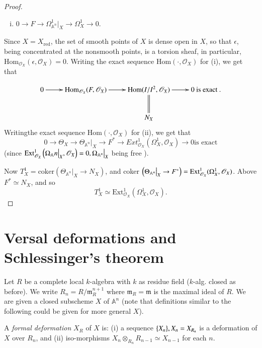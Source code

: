 {\begin{proof}
\begin{enumerate}[(i)]
\item $0 \to F \to \Omega^{1}_{\mathbb{A}^{n}}\big |_X \to \Omega_X^{1}\to 0$.
\end{enumerate}

Since $X=X_{\text{red}}$, the set of smooth points of $X$ is dense
open in $X$, so that $\epsilon$, being concentrated at the nonsmooth
points, is a torsion sheaf, in particular,
$\text{Hom}_{\mathscr{O}_{X}}(\epsilon, \mathscr{O}_{X})=0$. Writing
the exact sequence $\text{Hom}(\cdot, \mathscr{O}_{X})$ for (i), we
get that 

\begin{equation*}
\xymatrix{
0\ar[r]&\text{Hom}_{\mathscr{O}_{X}}(F, \mathscr{O}_{X})\ar
[r]& \text{Hom}(I/I^{2},\mathscr{O}_{X})\ar @ {=} [d] \ar [r]&
0 \text{ is exact }.\\ 
&                   & N_{X} &
}
\end{equation*}
Writing\pageoriginale the exact sequence
$\text{Hom}(\cdot,\mathscr{O}_X)$ for (ii), we get that 
$$
0\to \Theta_X\to \Theta_{\mathbb{A}^{n}}\big |_X \to F^{\ast}\to
Ext^{1}_{\mathscr{O}_X}(\Omega_{X}^{1}, \mathscr{O}_{X})\to 0\text{is
exact} 
$$
(since $\operatorname{Ext}^{1}_{\mathscr{O}_X} \left(\Omega_{\mathbb{A}}n\big
|_X, \mathscr{O}_X \right)=0, \Omega_{\mathbb{A}^{n}}\big |_X$ being
free ). 

 Now $T_X^{1}=\text{coker}\left(\Theta_{\mathbb{A}^{n}} \big |_X \to
 N_X\right)$, and coker $\left(\Theta_{\mathbb{A}^{n}}\big |_X \to
 F^{\ast}\right)=\text{Ext}_{\mathscr{O}_{X}}^{1}\break
 (\Omega_{X}^{1}, \mathscr{O}_X)$. Above $F^{\ast}\simeq N_X$, and so 
$$
T_X^{1}\simeq\text{Ext}_{\mathscr{O}_{X}}^{1}(\Omega_X^{1}, \mathscr{O}_X).
$$
\end{proof}

\section{Versal deformations and Schlessinger's theorem}\label{part1-sec7}

Let $R$ be a complete local $k$-algebra with $k$ as residue field
($k$-alg. closed as before). We write $R_n=R/\mathfrak{m}_{R}^{n+1}$
where $\mathfrak{m}_R=\mathfrak{m}$ is the maximal ideal of $R$. We
are given a closed subscheme $X$ of $\mathbb{A}^{n}$ (note that
definitions similar to the following could be given for more general
$X$). 

\begin{definition}\label{part1-defi7.1}%
A {\em formal deformation} $X_R$ of $X$ is: (i) a sequence $\{X_n\},\break
X_n=X_{R_{n}}$ is a deformation of $X$ over $R_n$, and (ii)
iso-morphisms $X_n\otimes_{R_{n}} R_{n-1}\simeq X_{n-1}$ for each
$n$. 


\end{definition}}
